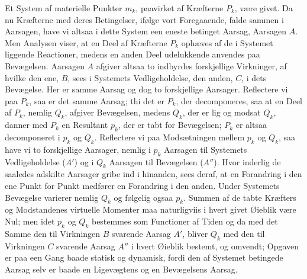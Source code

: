 \documentclass[12pt,a4paper]{book}
\begin{document}
Et System af materielle Punkter $m_{k}$, paavirket af Kræfterne $P_{k}$,
være givet. Da nu Kræfterne med deres Betingelser, ifølge vort
Foregaaende, falde sammen i Aarsagen, have vi altsaa i dette System een
eneste betinget Aarsag, Aarsagen $A$. Men Analysen viser, at en Deel af
Kræfterne $P_{k}$ ophæves af de i Systemet liggende Reactioner, medens en
anden Deel udelukkende anvendes paa Bevægelsen. Aarsagen $A$ afgiver
altsaa to indbyrdes forskjellige Virkninger, af hvilke den ene, $B$, sees
i Systemets Vedligeholdelse, den anden, $C$, i dets Bevægelse. Her er
samme Aarsag og dog to forskjellige Aarsager. Reflectere vi paa $P_{k}$,
saa er det samme Aarsag; thi det er $P_{k}$, der decomponeres, saa at en
Deel af $P_{k}$, nemlig $Q_{k}$, afgiver Bevægelsen, medens $Q_{k}$, der
er lig og modsat $Q_{k}$, danner med $P_{k}$ en Resultant $p_{k}$, der er
tabt for Bevægelsen; $P_{k}$ er altsaa decomponeret i $p_{k}$ og
$Q_{k}$. Reflectere vi paa Modsætningen mellem $p_{k}$ og $Q_{k}$, saa
have vi to forskjellige Aarsager, nemlig i $p_{k}$ Aarsagen til Systemets
Vedligeholdelse ($A'$) og i $Q_{k}$ Aarsagen til Bevægelsen ($A''$). Hvor
inderlig de saaledes adskilte Aarsager gribe ind i hinanden, sees deraf,
at en Forandring i den ene Punkt for Punkt medfører en Forandring i den
anden. Under Systemets Bevægelse varierer nemlig $Q_{k}$ og følgelig
ogsaa $p_{k}$. Summen af de tabte Kræfters og Modstandenes virtuelle
Momenter maa naturligviis i hvert givet Øieblik være Nul; men idet
$p_{k}$ og $Q_{k}$ bestemmes som Functioner af Tiden og da med det Samme
den til Virkningen $B$ svarende Aarsag $A'$, bliver $Q_{k}$ med den til
Virkningen $C$ svarende Aarsag $A''$ i hvert Øieblik bestemt, og omvendt;
Opgaven er paa een Gang baade statisk og dynamisk, fordi den af Systemet
betingede Aarsag selv er baade en Ligevægtens og en Bevægelsens Aarsag.
\end{document}
